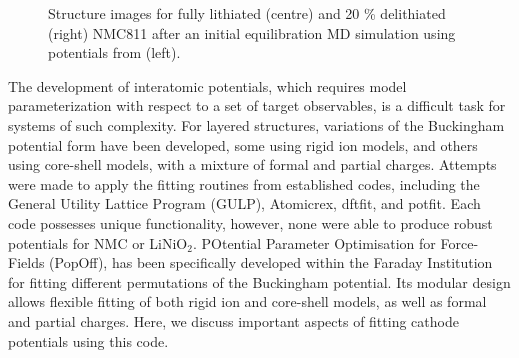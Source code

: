 \documentclass[journal=jacsat,manuscript=article]{achemso}
\begin{document}
\begin{figure}[h]
  \centering
    \caption{\label{fig:structure_collapse} Structure images for fully lithiated (centre) and 20 \% delithiated (right) NMC811 after an initial equilibration MD simulation using potentials from \citeauthor{Lee_and_Park_2012} (left). \cite{Lee_and_Park_2012} }
\end{figure}

The development of interatomic potentials, which requires model parameterization with respect to a set of target observables, is a difficult task for systems of such complexity.  
For layered structures, variations of the Buckingham potential form have been developed, some using rigid ion models,\cite{Lewis_1985,Ledwaba2020,Sayle2005,Dawson2014} and others using core-shell models,\cite{Hart1998,Fisher2010,Lewis_1985,Ammundsen1999,Kerisit2014,He2019,lee2012atomistic} with a mixture of formal and partial charges.
Attempts were made to apply the fitting routines from established codes, including the General Utility Lattice Program (GULP),\cite{gale_gulp_1997} Atomicrex,\cite{Stukowski_2017} dftfit,\cite{dftfit} and potfit.\cite{wen_kim-compliant_2017} 
Each code possesses unique functionality, however, none were able to produce robust potentials for NMC or LiNiO$_2$.
POtential Parameter Optimisation for Force-Fields (PopOff),\cite{Morgan2020PopOff} has been specifically developed within the Faraday Institution for fitting different permutations of the Buckingham potential. Its modular design allows flexible fitting of both rigid ion and core-shell models, as well as formal and partial charges. Here, we discuss important aspects of fitting cathode potentials using this code.
\end{document}
